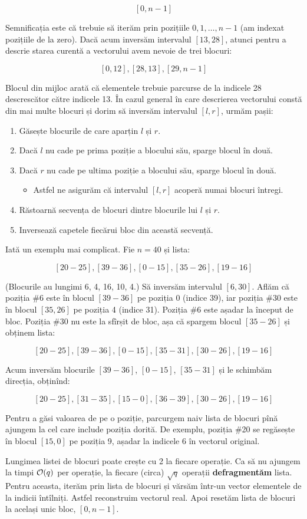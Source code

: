 \documentclass[../main.tex]{subfiles}
\begin{document}
$$[0,n-1]$$

Semnificația este că trebuie să iterăm prin pozițiile $0, 1, \dots, n-1$ (am indexat pozițiile de la zero). Dacă acum inversăm intervalul $[13, 28]$, atunci pentru a descrie starea curentă a vectorului avem nevoie de trei blocuri:

$$[0,12], [28, 13], [29, n-1]$$

Blocul din mijloc arată că elementele trebuie parcurse de la indicele 28 descrescător către indicele 13. În cazul general în care descrierea vectorului constă din mai multe blocuri și dorim să inversăm intervalul $[l, r]$, urmăm pașii:

\begin{enumerate}
  \item Găsește blocurile de care aparțin $l$ și $r$.

  \item Dacă $l$ nu cade pe prima poziție a blocului său, sparge blocul în două.

  \item Dacă $r$ nu cade pe ultima poziție a blocului său, sparge blocul în două.

  \begin{itemize}
    \item Astfel ne asigurăm că intervalul $[l,r]$ acoperă numai blocuri întregi.
  \end{itemize}

  \item Răstoarnă secvența de blocuri dintre blocurile lui $l$ și $r$.

  \item Inversează capetele fiecărui bloc din această secvență.
\end{enumerate}

Iată un exemplu mai complicat. Fie $n = 40$ și lista:

$$[20-25], [39-36], [0-15], [35-26], [19-16]$$

(Blocurile au lungimi 6, 4, 16, 10, 4.) Să inversăm intervalul $[6,30]$. Aflăm că poziția \#6 este în blocul $[39-36]$ pe poziția 0 (indice 39), iar poziția \#30 este în blocul $[35,26]$ pe poziția 4 (indice 31). Poziția \#6 este așadar la început de bloc. Poziția \#30 nu este la sfîrșit de bloc, așa că spargem blocul $[35-26]$ și obținem lista:

$$[20-25], [39-36], [0-15], [35-31], [30-26], [19-16]$$

Acum inversăm blocurile $[39-36]$, $[0-15]$, $[35-31]$ și le schimbăm direcția, obținînd:

$$[20-25], [31-35], [15-0], [36-39], [30-26], [19-16]$$

Pentru a găsi valoarea de pe o poziție, parcurgem naiv lista de blocuri pînă ajungem la cel care include poziția dorită. De exemplu, poziția \#20 se regăsește în blocul $[15,0]$ pe poziția 9, așadar la indicele 6 în vectorul original.

Lungimea listei de blocuri poate crește cu 2 la fiecare operație. Ca să nu ajungem la timpi $\mathcal{O}(q)$ per operație, la fiecare (circa) $\sqrt{q}$ operații \textbf{defragmentăm} lista. Pentru aceasta, iterăm prin lista de blocuri și vărsăm într-un vector elementele de la indicii întîlniți. Astfel reconstruim vectorul real. Apoi resetăm lista de blocuri la același unic bloc, $[0,n-1]$.
\end{document}
